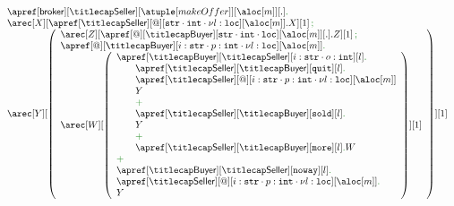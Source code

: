 
\begin{example}[Auction]
\[
  \begin{array}{l}
  \apref[\ptp {broker}][\amulti {Seller}][{\atuple[makeOffer]}][{\aloc[m]}][.] \mkop{.}
  \\  	
  \arec[X][{\apref[\amulti {Seller}][@][{{\asort[str]} \cdot {\asort[int]} \cdot {\nu l : \asort[loc]}}][{\aloc[m]}].X}][1] \seqop
  \\  	
  \arec[Y][{\left({
      	\begin{array}{l}
	\arec[Z][{\apref[@][\amulti {Buyer}][{{\asort[str]} \cdot {\asort[int]} \cdot {\asort[loc]}}][{\aloc[m]}][.].Z}][1] \seqop
	\\
	      \apref[@][\amulti {Buyer}][{{i : \asort[str]} \cdot {p : \asort[int]} \cdot {\nu l : \asort[loc]}}][{\aloc[m]}] \mkop{.}
	\\
	\arec[W][\left({
    	\begin{array}{l}
	\apref[\amulti {Buyer}][\amulti {Seller}][{i : \asort[{str}] \cdot {o : \asort[int]} }][{l}] \mkop{.}
	\\
	\qquad 
	\apref[\amulti {Seller}][\amulti {Buyer}][{\asort[quit]}][{l}] \mkop{.}
	\\
	\qquad 
	\apref[\amulti {Seller}][@][{{i : \asort[str]} \cdot {p : \asort[int]} \cdot {\nu l : \asort[loc]}}][{\aloc[m]}]
	\\
	\qquad
	Y	
	\\
	\qquad
	\chop
	\\
	\qquad 
	\apref[\amulti {Seller}][\amulti {Buyer}][{\asort[sold]}][{l}]\mkop{.}
	\\
	\qquad
	Y	
	\\
	\qquad
	\chop
	\\
	\qquad
	\apref[\amulti {Seller}][\amulti {Buyer}][{\asort[more]}][{l}] \mkop{.} W
	\\
	\chop
	\\
        \apref[\amulti {Buyer}][\amulti {Seller}][{\asort[{noway}]}][{l}] \mkop{.}
        \\
	\apref[\amulti {Seller}][@][{{i : \asort[str]} \cdot {p : \asort[int]} \cdot {\nu l : \asort[loc]}}][{\aloc[m]}] \mkop{.}
	\\
	Y
	\end{array}
	}\right)][1]
     	\end{array}
  }\right)}][1]
  \end{array}
\]
\finex
\end{example}


